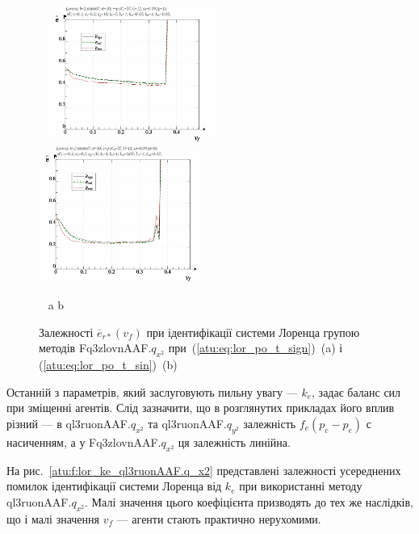 \begin{figure}[ht!]
  \begin{center}
    ~ \hfill
    \includegraphics[width=0.49\textwidth]{p/cha/lor/Fq3zlovnAAF/lor_Fq3zlovnAAF_qx2-p_v_f_e_sign.png}
    \hfill
    \includegraphics[width=0.49\textwidth]{p/cha/lor/Fq3zlovnAAF/lor_Fq3zlovnAAF_qx2-p_v_f_e_sin.png}
    \hfill ~
  \end{center}
  \vspace{-1.0ex}
  \begin{center}
    ~ \hfill a \hfill\hfill b \hfill ~
  \end{center}
  \vspace{-1.5ex}
  \caption{Залежності $ \overline{e}_{r *} (v_f) $ при ідентифікації системи Лоренца групою методів Fq3zlovnAAF.$q_{x^2} $ при~(\ref{atu:eq:lor_po_t_sign})~(a) і (\ref{atu:eq:lor_po_t_sin})~(b)}
\label{atu:f:lor_vf_Fq3zlovnAAF.q_x2}
\end{figure}

Останній з параметрів, який заслуговують пильну увагу ---
$ k_e $, задає баланс сил при зміщенні агентів. Слід
зазначити, що в розглянутих прикладах його вплив різний ---
в ql3ruonAAF.$q_{x^2}$ та ql3ruonAAF.$q_{y^2}$
залежність $f_e(p_c-p_e)$ с насиченням,
а у Fq3zlovnAAF.$q_{x^2}$ ця залежність линійна.

На рис.~\ref{atu:f:lor_ke_ql3ruonAAF.q_x2} представлені залежності усереднених
помилок ідентифікації системи Лоренца від
$k_e$ при використанні методу ql3ruonAAF.$q_{x^2} $. Малі значення цього коефіцієнта призводять до тех же
наслідків, що і малі значення $ v_f $ --- агенти стають практично нерухомими.


